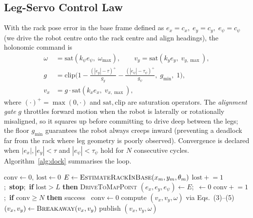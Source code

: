 \documentclass[11pt,a4paper]{article}
\begin{document}
\subsection{Leg-Servo Control Law}\label{sec:control}
With the rack pose error in the base frame defined as
$e_x=c_x,\; e_y=c_y,\; e_\psi=c_\psi$ (we drive the robot centre onto the rack
centre and align headings), the holonomic command is
\begin{align}
\omega &= \mathrm{sat}(k_\psi e_\psi,\;\omega_{\max}),\qquad
v_y = \mathrm{sat}(k_y e_y,\;v_{y,\max}),\\[2pt]
g &= \mathrm{clip}\!\Big(1-\tfrac{(|e_y|-\tau)^+}{g_y}-\tfrac{(|e_\psi|-\tau_\psi)^+}{g_\psi},\;
 g_{\min},\;1\Big),\\[2pt]
v_x &= g\cdot \mathrm{sat}(k_x e_x,\;v_{x,\max}),
\end{align}
where $(\cdot)^+=\max(0,\cdot)$ and $\mathrm{sat},\mathrm{clip}$ are
saturation operators. The \emph{alignment gate} $g$ throttles forward motion
when the robot is laterally or rotationally misaligned, so it squares up
before committing to drive deep between the legs; the floor $g_{\min}$
guarantees the robot always creeps inward (preventing a deadlock far from the
rack where leg geometry is poorly observed). Convergence is declared when
$|e_x|,|e_y|<\tau$ and $|e_\psi|<\tau_\psi$ hold for $N$ consecutive cycles.
Algorithm~\ref{alg:dock} summarises the loop.

\begin{algorithm}[h]
\caption{Leg-servo docking (15\,Hz)}\label{alg:dock}
\begin{algorithmic}[1]
\State $\text{conv}\gets0,\ \text{lost}\gets0$
  \State $E \gets \textsc{EstimateRackInBase}(x_m,y_m,\theta_m)$
     \State $\text{lost}\mathrel{+}=1$;\ \textbf{stop};\ \textbf{if} $\text{lost}>L$ \textbf{then} \Return \textsc{DriveToMapPoint}
  \Else
     \State $(e_x,e_y,e_\psi)\gets E$;\ $\gets0$
        \State $\text{conv}\mathrel{+}=1$;\ \textbf{if} $\text{conv}\ge N$ \textbf{then} \Return success
     \Else\ $\text{conv}\gets0$ \EndIf
     \State compute $(v_x,v_y,\omega)$ via Eqs.~(3)--(5)
     \State $(v_x,v_y)\gets\textsc{Breakaway}(v_x,v_y)$ 
     \State publish $(v_x,v_y,\omega)$
  \EndIf
\EndWhile
\end{algorithmic}
\end{algorithm}
\end{document}
